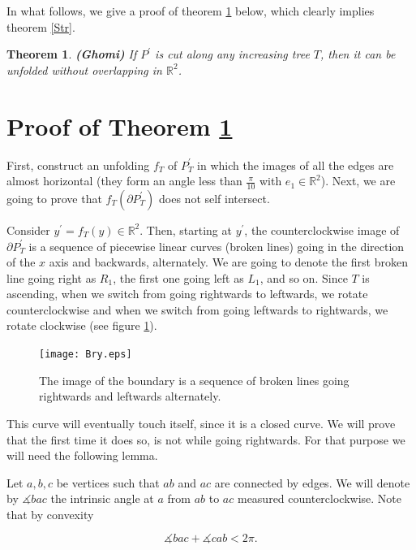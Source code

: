 \documentclass[openright, 12pt]{article}
\newtheorem{teorema}{Theorem}
\newcommand{\field}[1]{\ensuremath{\mathbb{#1}}}
\newcommand{\R}{\field{R}}
\begin{document}
In what follows, we give a proof of theorem \ref{Gho} below, which clearly implies theorem \ref{Str}. 



\begin{teorema}\label{Gho}
{\rm \textbf{(Ghomi)} If $P^{\prime}$ is cut along any increasing tree $T$, then it can be unfolded without overlapping in $\R ^2$.}
\end{teorema}

\section*{Proof of Theorem \ref{Gho}}

First, construct an unfolding $f_T$ of $P^{\prime}_T$ in which the images of all the edges are almost horizontal (they form an angle less than $\frac{\pi}{10}$ with $e_1 \in \R ^2$). Next, we are going to prove that $f_T(\partial P^{\prime}_T)$ does not self intersect.

Consider $y^{\prime} = f_T(y) \in \R ^2$. Then, starting at $y^{\prime}$, the counterclockwise image of $\partial P^{\prime}_T$ is a sequence of piecewise linear curves (broken lines) going in the direction of the $x$ axis and backwards, alternately. We are going to denote the first broken line going right as $R_1$, the first one going left as $L_1$, and so on. Since $T$ is ascending, when we switch from going rightwards to leftwards, we rotate counterclockwise and when we switch from going leftwards to rightwards, we rotate clockwise (see figure \ref{Cro}). 



\begin{figure}[h]
\centering
{}
\texttt{[image: Bry.eps]}
\caption{The image of the boundary is a sequence of broken lines going rightwards and leftwards alternately.}\label{Cro}
\end{figure}


This curve will eventually touch itself, since it is a closed curve. We will prove that the first time it does so, is not while going rightwards. For that purpose we will need the following lemma.


Let $a, b, c$ be vertices such that $ab $ and $ac$ are connected by edges. We will denote by $\measuredangle bac $ the intrinsic angle at $a $ from $ab$ to $ac$ measured counterclockwise. Note that by convexity

\begin{equation}\label{Alex}
\measuredangle bac + \measuredangle  cab  < 2\pi.
\end{equation} 
\end{document}
